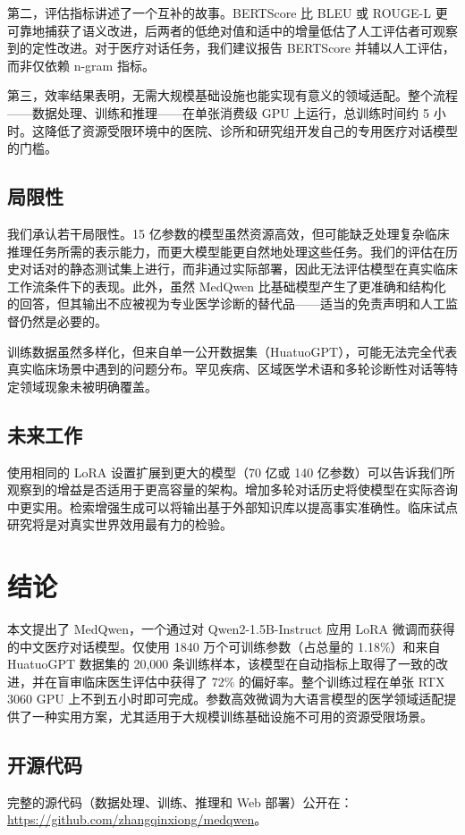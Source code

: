 \documentclass[12pt,a4paper]{article}
\begin{document}
第二，评估指标讲述了一个互补的故事。BERTScore 比 BLEU 或 ROUGE-L 更可靠地捕获了语义改进，后两者的低绝对值和适中的增量低估了人工评估者可观察到的定性改进。对于医疗对话任务，我们建议报告 BERTScore 并辅以人工评估，而非仅依赖 n-gram 指标。

第三，效率结果表明，无需大规模基础设施也能实现有意义的领域适配。整个流程——数据处理、训练和推理——在单张消费级 GPU 上运行，总训练时间约 5 小时。这降低了资源受限环境中的医院、诊所和研究组开发自己的专用医疗对话模型的门槛。

\subsection{局限性}

我们承认若干局限性。15 亿参数的模型虽然资源高效，但可能缺乏处理复杂临床推理任务所需的表示能力，而更大模型能更自然地处理这些任务。我们的评估在历史对话对的静态测试集上进行，而非通过实际部署，因此无法评估模型在真实临床工作流条件下的表现。此外，虽然 MedQwen 比基础模型产生了更准确和结构化的回答，但其输出不应被视为专业医学诊断的替代品——适当的免责声明和人工监督仍然是必要的。

训练数据虽然多样化，但来自单一公开数据集（HuatuoGPT），可能无法完全代表真实临床场景中遇到的问题分布。罕见疾病、区域医学术语和多轮诊断性对话等特定领域现象未被明确覆盖。

\subsection{未来工作}

使用相同的 LoRA 设置扩展到更大的模型（70 亿或 140 亿参数）可以告诉我们所观察到的增益是否适用于更高容量的架构。增加多轮对话历史将使模型在实际咨询中更实用。检索增强生成可以将输出基于外部知识库以提高事实准确性。临床试点研究将是对真实世界效用最有力的检验。

\section{结论}
\label{sec:conclusion}

本文提出了 MedQwen，一个通过对 Qwen2-1.5B-Instruct 应用 LoRA 微调而获得的中文医疗对话模型。仅使用 1840 万个可训练参数（占总量的 1.18\%）和来自 HuatuoGPT 数据集的 20,000 条训练样本，该模型在自动指标上取得了一致的改进，并在盲审临床医生评估中获得了 72\% 的偏好率。整个训练过程在单张 RTX 3060 GPU 上不到五小时即可完成。参数高效微调为大语言模型的医学领域适配提供了一种实用方案，尤其适用于大规模训练基础设施不可用的资源受限场景。

\subsection*{开源代码}
完整的源代码（数据处理、训练、推理和 Web 部署）公开在：\url{https://github.com/zhangqinxiong/medqwen}。



\end{document}
